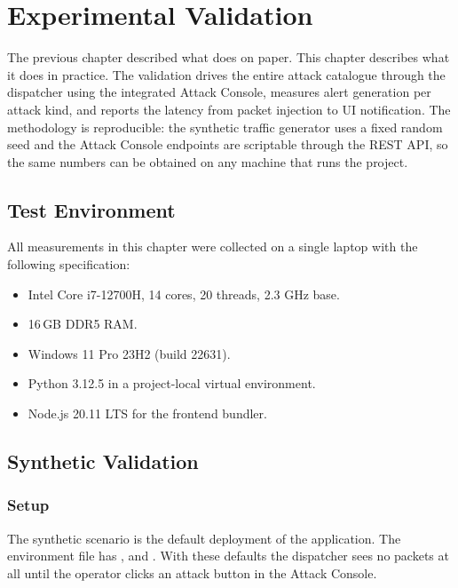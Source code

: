 \chapter{Experimental Validation}
\label{chap:validation}

The previous chapter described what \nidsname{} does on paper. This
chapter describes what it does in practice. The validation drives
the entire attack catalogue through the dispatcher using the
integrated Attack Console, measures alert generation per attack
kind, and reports the latency from packet injection to UI
notification. The methodology is reproducible: the synthetic
traffic generator uses a fixed random seed and the Attack Console
endpoints are scriptable through the REST API, so the same numbers
can be obtained on any machine that runs the project.

\section{Test Environment}
\label{sec:val-environment}

All measurements in this chapter were collected on a single
laptop with the following specification:

\begin{itemize}
  \item Intel Core i7-12700H, 14 cores, 20 threads, 2.3 GHz base.
  \item 16\,GB DDR5 RAM.
  \item Windows 11 Pro 23H2 (build 22631).
  \item Python 3.12.5 in a project-local virtual environment.
  \item Node.js 20.11 LTS for the frontend bundler.
\end{itemize}

\section{Synthetic Validation}
\label{sec:val-synthetic}

\subsection{Setup}
\label{sec:val-synthetic-setup}

The synthetic scenario is the default deployment of the
application. The environment file  has
, 
and . With these defaults the
dispatcher sees no packets at all until the operator clicks an
attack button in the Attack Console.

